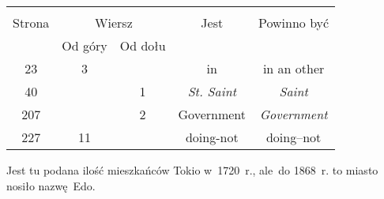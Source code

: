 \documentclass[a4paper,11pt]{article}
\begin{document}
\vspace{\spaceTwo}





\newpage
{}

\vspace{\spaceTwo} \vspace{\spaceThree}






\begin{center}
  \begin{tabular}{|c|c|c|c|c|}
    \hline
    & \multicolumn{2}{c|}{} & & \\
    Strona & \multicolumn{2}{c|}{Wiersz} & Jest
                              & Powinno być \\ \cline{2-3}
    & Od góry & Od dołu & & \\
    \hline
    23  &  3 & & in & in an other \\
    40  & &  1 & \emph{St. Saint} & \emph{Saint} \\
    207 & &  2 & Government & \emph{Government} \\
    227 & 11 & & doing-not & doing--not \\
    \hline
  \end{tabular}
\end{center}

\vspace{\spaceTwo}





\newpage
{}



\start {} Jest tu podana ilość mieszkańców Tokio w~1720~r.,
ale~do 1868~r. to miasto nosiło nazwę~Edo.

\vspace{\spaceFour}
\end{document}
